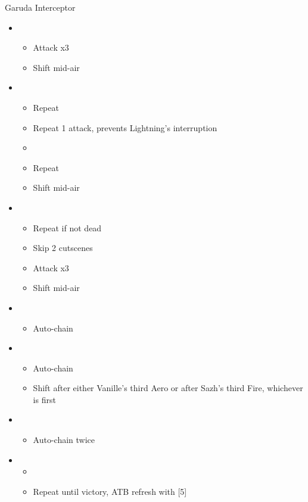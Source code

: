 \documentclass{report}
\begin{document}
\begin{battle}{Garuda Interceptor}
\begin{itemize}
    \item \first
    \begin{itemize}
        \item Attack x3
        \item Shift mid-air
    \end{itemize}
    \item \fifth
    \begin{itemize}
        \item Repeat
        \item Repeat 1 attack, prevents Lightning's interruption
        \item \stagger
        \item Repeat
        \item Shift mid-air
    \end{itemize}
    \item \first
    \begin{itemize}
        \item Repeat if not dead
        \item Skip 2 cutscenes
        \item Attack x3
        \item Shift mid-air
    \end{itemize}
    \item \third
    \begin{itemize}
        \item Auto-chain
    \end{itemize}
    \item \fourth
    \begin{itemize}
        \item Auto-chain
        \item Shift after either Vanille's third Aero or after Sazh's third Fire, whichever is first
    \end{itemize}
    \item \third
    \begin{itemize}
        \item Auto-chain twice
    \end{itemize}
    \item \first
    \begin{itemize}
        \item \stagger
        \item Repeat until victory, ATB refresh with [5]
    \end{itemize}
\end{itemize}
\end{battle}
\end{document}
